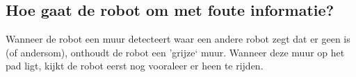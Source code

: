 \documentclass{peno}
\begin{document}
\subsection*{Hoe gaat de robot om met foute informatie?}
Wanneer de robot een muur detecteert waar een andere robot zegt dat er geen is (of andersom), onthoudt de robot een 'grijze` muur. Wanneer deze muur op het pad ligt, kijkt de robot eerst nog vooraleer er heen te rijden.

\end{document}
